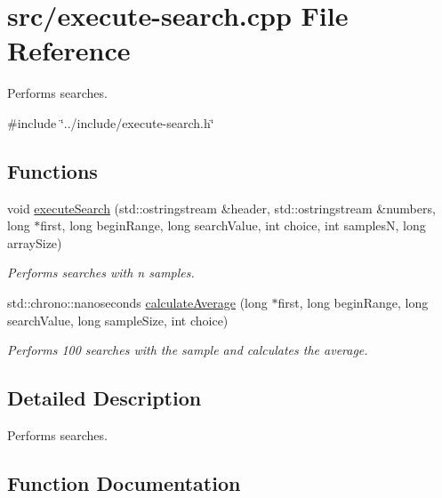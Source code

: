 \hypertarget{execute-search_8cpp}{}\section{src/execute-\/search.cpp File Reference}
\label{execute-search_8cpp}


Performs searches.  


{\ttfamily \#include \char`\"{}../include/execute-\/search.\+h\char`\"{}}\newline
\subsection*{Functions}
\begin{DoxyCompactItemize}
\item 
void \mbox{\hyperlink{execute-search_8cpp_add6898191acaf3cbf729012cc3b95afa}{execute\+Search}} (std\+::ostringstream \&header, std\+::ostringstream \&numbers, long $\ast$first, long begin\+Range, long search\+Value, int choice, int samplesN, long array\+Size)
\begin{DoxyCompactList}\small\item\em Performs searches with n samples. \end{DoxyCompactList}\item 
std\+::chrono\+::nanoseconds \mbox{\hyperlink{execute-search_8cpp_a42e66a1ddcf8869c50fde7c7f7599a77}{calculate\+Average}} (long $\ast$first, long begin\+Range, long search\+Value, long sample\+Size, int choice)
\begin{DoxyCompactList}\small\item\em Performs 100 searches with the sample and calculates the average. \end{DoxyCompactList}\end{DoxyCompactItemize}


\subsection{Detailed Description}
Performs searches. 



\subsection{Function Documentation}
\mbox{\label{execute-search_8cpp_a42e66a1ddcf8869c50fde7c7f7599a77}} 
